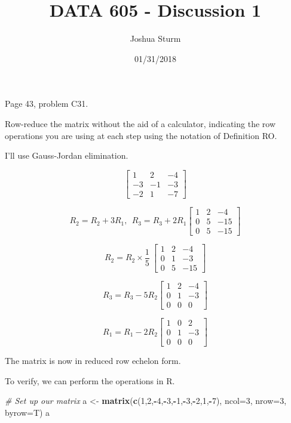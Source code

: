 \documentclass[]{article}
\title{DATA 605 - Discussion 1}
\author{Joshua Sturm}
\date{01/31/2018}
\newenvironment{Shaded}{\begin{snugshade}}{\end{snugshade}}
\newcommand{\KeywordTok}[1]{\textcolor[rgb]{0.13,0.29,0.53}{\textbf{#1}}}
\newcommand{\DataTypeTok}[1]{\textcolor[rgb]{0.13,0.29,0.53}{#1}}
\newcommand{\DecValTok}[1]{\textcolor[rgb]{0.00,0.00,0.81}{#1}}
\newcommand{\StringTok}[1]{\textcolor[rgb]{0.31,0.60,0.02}{#1}}
\newcommand{\CommentTok}[1]{\textcolor[rgb]{0.56,0.35,0.01}{\textit{#1}}}
\newcommand{\OperatorTok}[1]{\textcolor[rgb]{0.81,0.36,0.00}{\textbf{#1}}}
\newcommand{\NormalTok}[1]{#1}
\begin{document}
\maketitle

Page 43, problem C31.

Row-reduce the matrix without the aid of a calculator, indicating the
row operations you are using at each step using the notation of
Definition RO.

I'll use Gauss-Jordan elimination.

\[\begin{bmatrix}
1 & 2 & -4 \\
-3 & -1 & -3 \\
-2 & 1 & -7
\end{bmatrix}\]

\[R_2 = R_2 + 3R_1, \ \ R_3 = R_3 + 2R_1
\begin{bmatrix}
1 & 2 & -4 \\
0 & 5 & -15 \\
0 & 5 & -15
\end{bmatrix}\]

\[R_2 = R_2\times \frac{1}{5} \
\begin{bmatrix}
1 & 2 & -4 \\
0 & 1 & -3 \\
0 & 5 & -15
\end{bmatrix}\]

\[R_3 = R_3 - 5R_2
\begin{bmatrix}
1 & 2 & -4 \\
0 & 1 & -3 \\
0 & 0 & 0
\end{bmatrix}\]

\[R_1 = R_1 -2R_2
\begin{bmatrix}
1 & 0 & 2 \\
0 & 1 & -3 \\
0 & 0 & 0
\end{bmatrix}\]

The matrix is now in reduced row echelon form.

To verify, we can perform the operations in R.

\begin{Shaded}
\begin{Highlighting}[]
\CommentTok{# Set up our matrix}
\NormalTok{a <-}\StringTok{ }\KeywordTok{matrix}\NormalTok{(}\KeywordTok{c}\NormalTok{(}\DecValTok{1}\NormalTok{,}\DecValTok{2}\NormalTok{,}\OperatorTok{-}\DecValTok{4}\NormalTok{,}\OperatorTok{-}\DecValTok{3}\NormalTok{,}\OperatorTok{-}\DecValTok{1}\NormalTok{,}\OperatorTok{-}\DecValTok{3}\NormalTok{,}\OperatorTok{-}\DecValTok{2}\NormalTok{,}\DecValTok{1}\NormalTok{,}\OperatorTok{-}\DecValTok{7}\NormalTok{), }\DataTypeTok{ncol=}\DecValTok{3}\NormalTok{, }\DataTypeTok{nrow=}\DecValTok{3}\NormalTok{, }\DataTypeTok{byrow=}\NormalTok{T)}
\NormalTok{a}
\end{Highlighting}
\end{Shaded}
\end{document}
